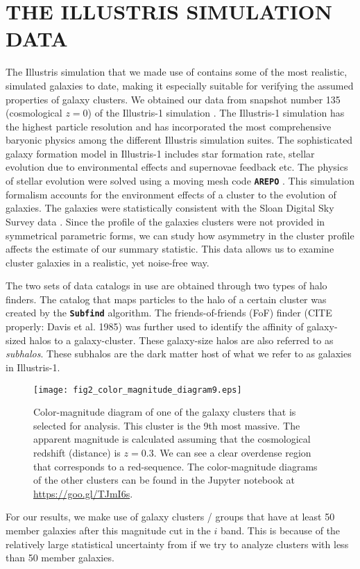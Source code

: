 \section{THE ILLUSTRIS SIMULATION DATA} 
\label{sec:illustris_sim}
The Illustris simulation that we made use of contains some of the most
realistic, simulated galaxies to date, making it especially suitable for 
verifying the assumed properties of galaxy clusters. We obtained our data from 
snapshot number 135 (cosmological $z=0$) of the Illustris-1 simulation . The Illustris-1
simulation has the highest particle resolution and has incorporated the most 
comprehensive baryonic physics among the different Illustris simulation suites. 
The sophisticated galaxy formation model in Illustris-1 
 includes star formation rate, stellar evolution due to
environmental effects and supernovae feedback etc. The physics of stellar
evolution were solved using a moving mesh code {\bf \texttt{AREPO}} \citep{Springel2010}.
This simulation formalism accounts for the environment effects of a cluster to the
evolution of galaxies. The galaxies were statistically consistent
with the Sloan Digital Sky Survey data
\citet{Vogelsberger2014}. Since the profile of the galaxies clusters were not
provided in symmetrical parametric forms, we can study 
how asymmetry in the cluster profile affects the estimate of our summary 
statistic. This data allows us to examine cluster galaxies
in a realistic, yet noise-free way.

The two sets of data catalogs in use are obtained through two types of halo
finders. The catalog that maps particles to the halo of a certain cluster was 
created by the {\bf \texttt{Subfind}} algorithm. The friends-of-friends (FoF) 
finder (CITE properly: Davis et al. 1985) was further used to identify the affinity
of galaxy-sized halos to a galaxy-cluster. 
These galaxy-size halos are also referred to as {\it subhalos}. These
subhalos are the dark matter host of what we refer to as galaxies in Illustris-1. 



\begin{figure}
	\centering
	\texttt{[image: fig2\_color\_magnitude\_diagram9.eps]}
	\caption{Color-magnitude diagram of one of the galaxy clusters that is selected for 
		analysis. This cluster is the 9th most massive. 
		The apparent magnitude is calculated assuming that 
		the cosmological redshift (distance) is $z = 0.3$. 
		We can see a clear overdense region that corresponds to a red-sequence.
		The color-magnitude diagrams of the other clusters can be found in the
		Jupyter notebook at \href{https://github.com/karenyyng/galaxy_DM_offset/blob/master/code/analyses/fig2_color_magnitude_diagram.ipynb}{https://goo.gl/TJmI6s}.
		\label{fig:color_magnitude_diagram}
	} 
\end{figure}
For our results, we make use of galaxy clusters / groups 
that have at least 50 member galaxies after this magnitude cut in the $i$ band. 
This is because of the relatively large statistical uncertainty from if we try
to analyze clusters with less than 50 member galaxies. 



